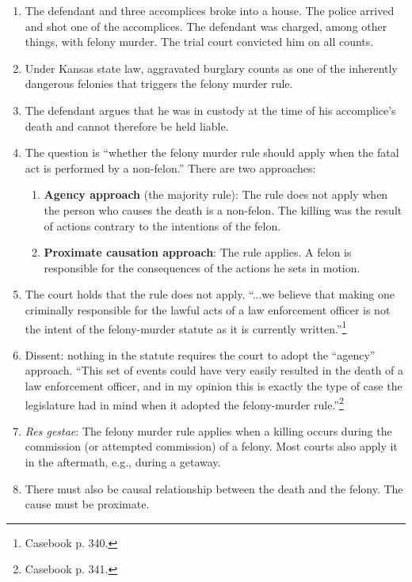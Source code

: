 \begin{enumerate}
    \item The defendant and three accomplices broke into a house. The police arrived and shot one of the accomplices. The defendant was charged, among other things, with felony murder. The trial court convicted him on all counts.
    \item Under Kansas state law, aggravated burglary counts as one of the inherently dangerous felonies that triggers the felony murder rule.
    \item The defendant argues that he was in custody at the time of his accomplice's death and cannot therefore be held liable.
    \item The question is ``whether the felony murder rule should apply when the fatal act is performed by a non-felon.'' There are two approaches:
    \begin{enumerate}
        \item \textbf{Agency approach} (the majority rule): The rule does not apply when the person who causes the death is a non-felon. The killing was the result of actions contrary to the intentions of the felon.
        \item \textbf{Proximate causation approach}: The rule applies. A felon is responsible for the consequences of the actions he sets in motion.
    \end{enumerate}
    \item The court holds that the rule does not apply. ``...we believe that making one criminally responsible for the lawful acts of a law enforcement officer is not the intent of the felony-murder statute as it is currently written.''\footnote{Casebook p. 340.}
    \item Dissent: nothing in the statute requires the court to adopt the ``agency'' approach. ``This set of events could have very easily resulted in the death of a law enforcement officer, and in my opinion this is exactly the type of case the legislature had in mind when it adopted the felony-murder rule.''\footnote{Casebook p. 341.}
    \item \emph{Res gestae}: The felony murder rule applies when a killing occurs during the commission (or attempted commission) of a felony. Most courts also apply it in the aftermath, e.g., during a getaway.
    \item There must also be causal relationship between the death and the felony. The cause must be proximate.
\end{enumerate}

